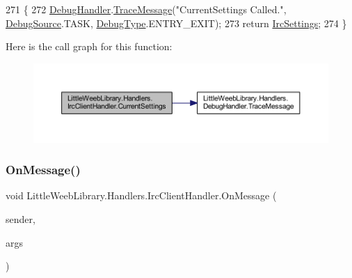 \begin{DoxyCode}
271         \{
272             \mbox{\hyperlink{class_little_weeb_library_1_1_handlers_1_1_irc_client_handler_ab50ece494948d25db1839f4d6eab038f}{DebugHandler}}.\mbox{\hyperlink{interface_little_weeb_library_1_1_handlers_1_1_i_debug_handler_a2e405bc3492e683cd3702fae125221bc}{TraceMessage}}(\textcolor{stringliteral}{"CurrentSettings Called."}, 
      \mbox{\hyperlink{namespace_little_weeb_library_1_1_handlers_a2a6ca0775121c9c503d58aa254d292be}{DebugSource}}.TASK, \mbox{\hyperlink{namespace_little_weeb_library_1_1_handlers_ab66019ed40462876ec4e61bb3ccb0a62}{DebugType}}.ENTRY\_EXIT);
273             \textcolor{keywordflow}{return} \mbox{\hyperlink{class_little_weeb_library_1_1_handlers_1_1_irc_client_handler_a5a8c1eee913ec3c9afad8acd1bfbc37c}{IrcSettings}};
274         \}
\end{DoxyCode}
Here is the call graph for this function\+:\nopagebreak
\begin{figure}[H]
\begin{center}
\leavevmode
\includegraphics[width=350pt]{class_little_weeb_library_1_1_handlers_1_1_irc_client_handler_aa15fe2f3c1bd99a513400b0880298edd_cgraph}
\end{center}
\end{figure}
\mbox{\label{class_little_weeb_library_1_1_handlers_1_1_irc_client_handler_ad97947bcce5bebd851bef6e29fecb467}} 
\subsubsection{\texorpdfstring{On\+Message()}{OnMessage()}}
{\footnotesize\ttfamily void Little\+Weeb\+Library.\+Handlers.\+Irc\+Client\+Handler.\+On\+Message (\begin{DoxyParamCaption}\item[{object}]{sender,  }\item[{Irc\+Received\+Event\+Args}]{args }\end{DoxyParamCaption})\hspace{0.3cm}{\ttfamily [private]}}



